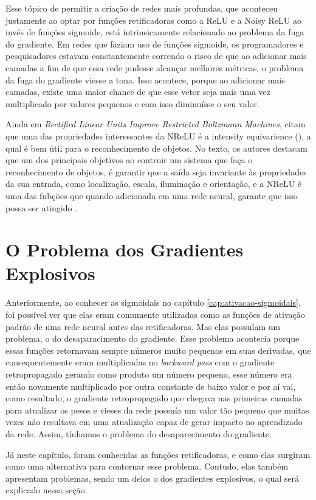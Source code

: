 Esse tópico de permitir a criação de redes mais profundas, que aconteceu justamente ao optar por funções retificadoras como a ReLU e a Noisy ReLU ao invés de funções sigmoide, está intrinsicamente relacionado ao problema da fuga do gradiente. Em redes que faziam uso de funções sigmoide, os programadores e pesquisadores estavam constantemente correndo o risco de que ao adicionar mais camadas a fim de que essa rede pudesse alcançar melhores métricas, o problema da fuga do gradiente viesse a tona. Isso acontece, porque ao adicionar mais camadas, existe uma maior chance de que esse vetor seja mais uma vez multiplicado por valores pequenos e com isso diminuísse o seu valor.

Ainda em \textit{Rectified Linear Units Improve Restricted Boltzmann Machines}, \textcite{Nair2010} citam que uma das propriedades interessantes da NReLU é a intensity equivarience (), a qual é bem útil para o reconhecimento de objetos. No texto, os autores destacam que um dos principais objetivos ao contruir um sistema que faça o reconhecimento de objetos, é garantir que a saída seja invariante às propriedades da sua entrada, como localização, escala, iluminação e orientação, e a NReLU é uma das fubções que quando adicionada em uma rede neural, garante que isso possa ser atingido \parencite{Nair2010}.

\section{O Problema dos Gradientes Explosivos}

Anteriormente, ao conhecer as sigmoidais no capítulo \ref{cap:ativacao-sigmoidais}, foi possível ver que elas eram comumente utilizadas como as funções de ativação padrão de uma rede neural antes das retificadoras. Mas elas possuíam um problema, o do desaparacimento do gradiente. Esse problema acontecia porque essas funções retornavam sempre números muito pequenos em suas derivadas, que consequentemente eram multiplicadas no \textit{backward pass} com o gradiente retropropagado gerando como produto um número pequeno, esse número era então novamente multiplicado por outra constante de baixo valor e por aí vai, como resultado, o gradiente retropropagado que chegava nas primeiras camadas para atualizar os pesos e vieses da rede possuía um valor tão pequeno que muitas vezes não resultava em uma atualização capaz de gerar impacto no aprendizado da rede. Assim, tínhamos o problema do desaparecimento do gradiente.

Já neste capítulo, foram conhecidas as funções retificadoras, e como elas surgiram como uma alternativa para contornar esse problema. Contudo, elas também apresentam problemas, sendo um delos o dos gradientes explosivos, o qual será explicado nessa seção.

